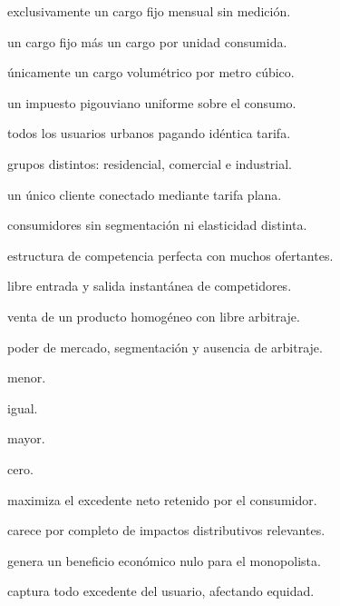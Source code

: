 \begin{opts}
    \item exclusivamente un cargo fijo mensual sin medición.
    \item un cargo fijo más un cargo por unidad consumida.
    \item únicamente un cargo volumétrico por metro cúbico.
    \item un impuesto pigouviano uniforme sobre el consumo.
\end{opts}

\begin{opts}
    \item todos los usuarios urbanos pagando idéntica tarifa.
    \item grupos distintos: residencial, comercial e industrial.
    \item un único cliente conectado mediante tarifa plana.
    \item consumidores sin segmentación ni elasticidad distinta.
\end{opts}

\begin{opts}
    \item estructura de competencia perfecta con muchos ofertantes.
    \item libre entrada y salida instantánea de competidores.
    \item venta de un producto homogéneo con libre arbitraje.
    \item poder de mercado, segmentación y ausencia de arbitraje.
\end{opts}

\begin{opts}
    \item menor.
    \item igual.
    \item mayor.
    \item cero.
\end{opts}

\begin{opts}
    \item maximiza el excedente neto retenido por el consumidor.
    \item carece por completo de impactos distributivos relevantes.
    \item genera un beneficio económico nulo para el monopolista.
    \item captura todo excedente del usuario, afectando equidad.
\end{opts}

